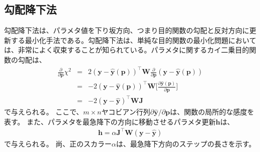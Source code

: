 \documentclass[titlepage]{jsreport}
\begin{document}
\subsection{勾配降下法}\label{principle-subsec:gradient-descent}
勾配降下法は、パラメタ値を下り坂方向、つまり目的関数の勾配と反対方向に更新する最小化手法である。勾配降下法は、単純な目的関数の最小化問題においては、非常によく収束することが知られている\cite{gradient-descent}。パラメタに関するカイ二乗目的関数の勾配は、
\large
\begin{eqnarray}
\frac{\partial}{\partial\bm{p}}\chi^2 &=& 2(\bm{y}-\hat{\bm{y}}(\bm{p}))^\top\bm{W}\frac{\partial}{\partial\bm{p}}(\bm{y}-\hat{\bm{y}}(\bm{p})) \nonumber\\
                                      &=& -2(\bm{y}-\hat{\bm{y}}(\bm{p}))^\top\bm{W}\Bigg[\frac{\partial\hat{\bm{y}}(\bm{p})}{\partial\bm{p}}\Bigg] \nonumber\\
                                      &=& -2(\bm{y}-\hat{\bm{y}})^\top\bm{W}\bm{J} \label{eq:gradient-of-the-chi-square-objective-function}
\end{eqnarray}
\normalsize
で与えられる。
ここで、$m×n$ヤコビアン行列$\partial\hat{\bm{y}}/{\partial\bm{p}}$は、関数の局所的な感度を表す。
また、パラメタを最急降下の方向に移動させるパラメタ更新$\bm{h}$は、
\large
\begin{eqnarray}
\bm{h} = \alpha\bm{J}^\top\bm{W}(\bm{y}-\hat{\bm{y}})
\end{eqnarray}
\normalsize
で与えられる\cite{gradient-descent_gauss-newton_levenberg-marquardt}。
尚、正のスカラー$\alpha$は、最急降下方向のステップの長さを示す。
\end{document}
